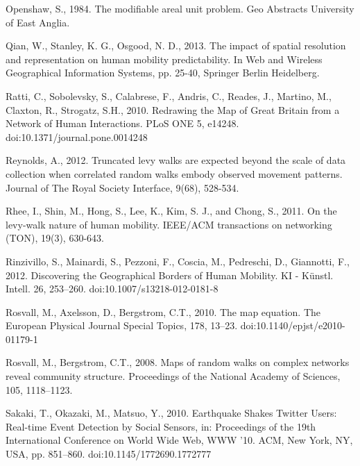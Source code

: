 \documentclass[]{tGIS2e}
\begin{document}
\begin{thebibliography}{9}
Openshaw, S., 1984. The modifiable areal unit problem. Geo Abstracts University of East Anglia.

Qian, W., Stanley, K. G., Osgood, N. D., 2013. The impact of spatial resolution and representation on human mobility predictability. In Web and Wireless Geographical Information Systems,  pp. 25-40, Springer Berlin Heidelberg.

Ratti, C., Sobolevsky, S., Calabrese, F., Andris, C., Reades, J., Martino, M., Claxton, R., Strogatz, S.H., 2010. Redrawing the Map of Great Britain from a Network of Human Interactions. PLoS ONE 5, e14248. doi:10.1371/journal.pone.0014248

Reynolds, A., 2012. Truncated levy walks are expected beyond the scale of data collection when correlated random walks embody observed movement patterns. Journal of The Royal Society Interface, 9(68), 528-534.

Rhee, I., Shin, M., Hong, S., Lee, K., Kim, S. J., and Chong, S., 2011. On the levy-walk nature of human mobility. IEEE/ACM transactions on networking (TON), 19(3), 630-643.

Rinzivillo, S., Mainardi, S., Pezzoni, F., Coscia, M., Pedreschi, D., Giannotti, F., 2012. Discovering the Geographical Borders of Human Mobility. KI - Künstl. Intell. 26, 253–260. doi:10.1007/s13218-012-0181-8


Rosvall, M., Axelsson, D., Bergstrom, C.T., 2010. The map equation. The European Physical Journal Special Topics, 178, 13–23. doi:10.1140/epjst/e2010-01179-1

Rosvall, M., Bergstrom, C.T., 2008. Maps of random walks on complex networks reveal community structure. Proceedings of the National Academy of Sciences, 105, 1118–1123.





Sakaki, T., Okazaki, M., Matsuo, Y., 2010. Earthquake Shakes Twitter Users: Real-time Event Detection by Social Sensors, in: Proceedings of the 19th International Conference on World Wide Web, WWW ’10. ACM, New York, NY, USA, pp. 851–860. doi:10.1145/1772690.1772777





\end{thebibliography}
\end{document}
